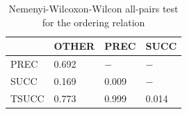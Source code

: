 \documentclass[twoside,11pt]{article}
\begin{document}
\begin{table}[h!]
  \centering
  \begin{tabular}{llll}
    \toprule
          & OTHER & PREC  & SUCC  \\
    \midrule
    PREC  & 0.692 & \(-\) & \(-\) \\
    SUCC  & 0.169 & 0.009 & \(-\) \\
    TSUCC & 0.773 & 0.999 & 0.014 \\
    \bottomrule
  \end{tabular}
  \caption{Nemenyi-Wilcoxon-Wilcon all-pairs test for the ordering relation}
  \label{tab:nww-ord}
\end{table}


\vskip 0.2in


\end{document}
